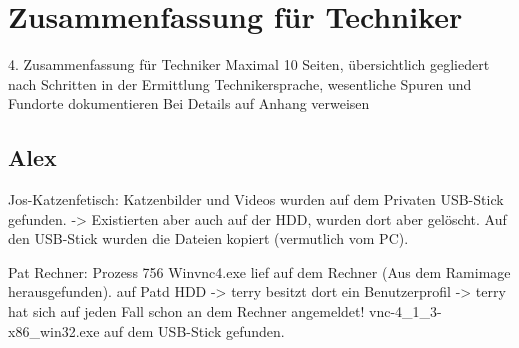 \chapter{Zusammenfassung für Techniker}
\label{sec:tec}


4. Zusammenfassung für Techniker
Maximal 10 Seiten, übersichtlich gegliedert nach Schritten in der Ermittlung
Technikersprache, wesentliche Spuren und Fundorte dokumentieren
Bei Details auf Anhang verweisen

\section{Alex}
Jos-Katzenfetisch:
Katzenbilder und Videos wurden auf dem Privaten USB-Stick gefunden. -> Existierten aber auch auf der HDD, wurden dort aber gelöscht.
Auf den USB-Stick wurden die Dateien kopiert (vermutlich vom PC).

Pat Rechner:
Prozess 756 Winvnc4.exe lief auf dem Rechner (Aus dem Ramimage herausgefunden).
auf Patd HDD -> terry besitzt dort ein Benutzerprofil -> terry hat sich auf jeden Fall schon an dem Rechner angemeldet!
	vnc-4_1_3-x86_win32.exe auf dem USB-Stick gefunden.